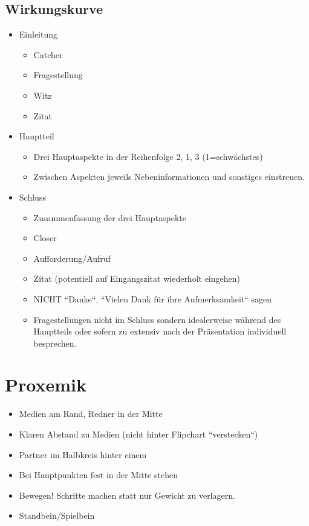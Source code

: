 \documentclass[../main.tex]{subfiles}
\begin{document}
        \subsection{Wirkungskurve}
        	\label{section:Seminar:RhetorikI:Wirkungskurve}
        	\begin{itemize}
        		\item Einleitung
        		\begin{itemize}
        			\item Catcher
        			\item Fragestellung
        			\item Witz
        			\item Zitat
        		\end{itemize}
        		\item Hauptteil
        		\begin{itemize}
        			\item Drei Hauptaspekte in der Reihenfolge 2, 1, 3 (1=schwächstes)
        			\item Zwischen Aspekten jeweils Nebeninformationen und sonstiges einstreuen.
        		\end{itemize}
        		\item Schluss
        		\begin{itemize}
        			\item Zusammenfassung der drei Hauptaspekte
        			\item Closer
        			\item Aufforderung/Aufruf
        			\item Zitat (potentiell auf Eingangszitat wiederholt eingehen)
        			\item NICHT ``Danke``, ``Vielen Dank für ihre Aufmerksamkeit``  sagen
        			\item Fragestellungen nicht im Schluss sondern idealerweise während des Hauptteils oder sofern zu extensiv nach der Präsentation individuell besprechen. 
        		\end{itemize}
        	\end{itemize}
            
    \section{Proxemik}
    	\begin{itemize}
    		\item Medien am Rand, Redner in der Mitte
    		\item Klaren Abstand zu Medien (nicht hinter Flipchart ``verstecken``)
    		\item Partner im Halbkreis hinter einem
    		\item Bei Hauptpunkten fest in der Mitte stehen 
    		\item Bewegen! Schritte machen statt nur Gewicht zu verlagern.
    		\item Standbein/Spielbein
    	\end{itemize}
    
\end{document}
